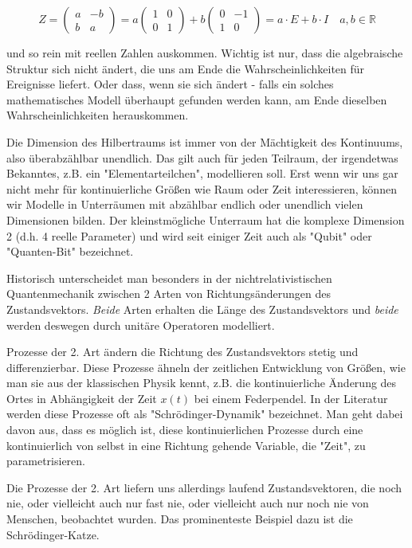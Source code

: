 \documentclass[12pt]{book}
\begin{document}
\begin{equation*}
Z = \begin{pmatrix}a&-b\\b&a\end{pmatrix} = a \begin{pmatrix}1&0\\0&1\end{pmatrix} + b \begin{pmatrix}0&-1\\1&0\end{pmatrix} = a \cdot E + b \cdot I \quad a,b \in \mathbb{R}
\end{equation*} 

und so rein mit reellen Zahlen auskommen. Wichtig ist nur, dass die algebraische Struktur sich nicht ändert, die uns am Ende die Wahrscheinlichkeiten für Ereignisse liefert. Oder dass, wenn sie sich ändert - falls ein solches mathematisches Modell überhaupt gefunden werden kann, am Ende dieselben Wahrscheinlichkeiten herauskommen. 

Die Dimension des Hilbertraums ist immer von der Mächtigkeit des Kontinuums, also überabzählbar unendlich. Das gilt auch für jeden Teilraum, der irgendetwas Bekanntes, z.B. ein "Elementarteilchen", modellieren soll. Erst wenn wir uns gar nicht mehr für  kontinuierliche Größen wie Raum oder Zeit interessieren, können wir Modelle in Unterräumen mit abzählbar endlich oder unendlich vielen Dimensionen bilden. Der kleinstmögliche Unterraum hat die komplexe Dimension 2 (d.h. 4 reelle Parameter) und wird seit einiger Zeit auch als "Qubit" oder "Quanten-Bit" bezeichnet. 

Historisch unterscheidet man besonders in der nichtrelativistischen Quantenmechanik zwischen 2 Arten von Richtungsänderungen des Zustandsvektors. \emph{Beide} Arten erhalten die Länge des Zustandsvektors und \emph{beide} werden deswegen durch unitäre Operatoren modelliert.

Prozesse der 2. Art ändern die Richtung des Zustandsvektors stetig und differenzierbar. Diese Prozesse ähneln der zeitlichen Entwicklung von Größen, wie man sie aus der klassischen Physik kennt, z.B. die kontinuierliche Änderung des Ortes in Abhängigkeit der Zeit $x(t)$ bei einem Federpendel. In der Literatur werden diese Prozesse oft als "Schrödinger-Dynamik" bezeichnet. Man geht dabei davon aus, dass es möglich ist, diese kontinuierlichen Prozesse durch eine kontinuierlich von selbst in eine Richtung gehende Variable, die "Zeit", zu parametrisieren. 

Die Prozesse der 2. Art liefern uns allerdings laufend Zustandsvektoren, die noch nie, oder vielleicht auch nur fast nie, oder vielleicht auch nur noch nie von Menschen, beobachtet wurden. Das prominenteste Beispiel dazu ist die Schrödinger-Katze.
\end{document}
